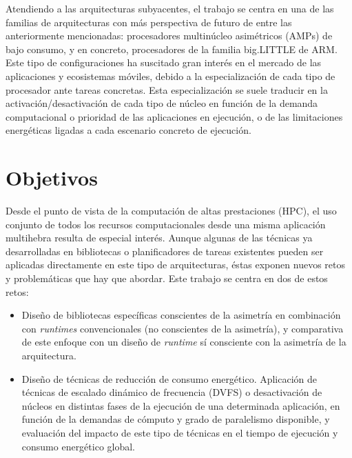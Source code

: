 Atendiendo a las arquitecturas subyacentes, el trabajo se centra en una de
las familias de arquitecturas con más perspectiva de futuro de entre las
anteriormente mencionadas: procesadores multinúcleo asimétricos (AMPs) de
bajo consumo, y en concreto, procesadores de la familia big.LITTLE de ARM.
Este tipo de configuraciones ha suscitado gran interés en el mercado de las
aplicaciones y ecosistemas móviles, debido a la especialización de cada
tipo de procesador ante tareas concretas. Esta especialización se suele
traducir en la activación/desactivación de cada tipo de núcleo en función
de la demanda computacional o prioridad de las aplicaciones en ejecución, o
de las limitaciones energéticas ligadas a cada escenario concreto de
ejecución.


\section{Objetivos}
Desde el punto de vista de la computación de altas prestaciones (HPC), el
uso conjunto de todos los recursos computacionales desde una misma
aplicación multihebra resulta de especial interés. Aunque algunas de las
técnicas ya desarrolladas en bibliotecas o planificadores de tareas
existentes pueden ser aplicadas directamente en este tipo de arquitecturas,
éstas exponen nuevos retos y problemáticas que hay que abordar. Este
trabajo se centra en dos de estos retos:
\begin{itemize}
\item Diseño de bibliotecas específicas conscientes de la asimetría en
  combinación con \emph{runtimes} convencionales (no conscientes de la
  asimetría), y comparativa de este enfoque con un diseño de \emph{runtime}
  sí consciente con la asimetría de la arquitectura.
\item Diseño de técnicas de reducción de consumo energético. Aplicación de
  técnicas de escalado dinámico de frecuencia (DVFS) o desactivación de
  núcleos en distintas fases de la ejecución de una determinada aplicación,
  en función de la demandas de cómputo y grado de paralelismo disponible, y
  evaluación del impacto de este tipo de técnicas en el tiempo de ejecución
  y consumo energético global.
\end{itemize}



